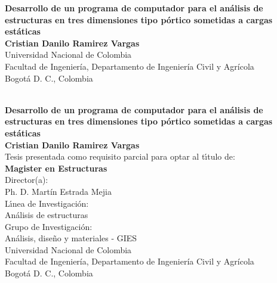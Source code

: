 \begin{center}
\begin{figure}
\centering%
%
\end{figure}
\thispagestyle{empty} \vspace*{2.0cm} \textbf{\huge
Desarrollo de un programa de computador para el análisis de estructuras en tres dimensiones tipo pórtico sometidas a cargas estáticas}\\[5.0cm]
\Large\textbf{Cristian Danilo Ramirez Vargas}\\[5.0cm]
\small Universidad Nacional de Colombia\\
Facultad de Ingeniería, Departamento de Ingeniería Civil y Agrícola\\
Bogotá D. C., Colombia\\
\the\year\\
\end{center}

\newpage{\pagestyle{empty}\cleardoublepage}

\newpage
\begin{center}
\thispagestyle{empty} \vspace*{0cm} \textbf{\huge
Desarrollo de un programa de computador para el análisis de estructuras en tres dimensiones tipo pórtico sometidas a cargas estáticas}\\[1.0cm]
\Large\textbf{Cristian Danilo Ramirez Vargas}\\[3.0cm]
\small Tesis presentada como requisito parcial para optar al
t\'{\i}tulo de:\\
\textbf{Magister en Estructuras}\\[2.5cm]
Director(a):\\
Ph. D. Martín Estrada Mejia\\[2.0cm]
L\'{\i}nea de Investigaci\'{o}n:\\
Análisis de estructuras\\
Grupo de Investigaci\'{o}n:\\
Análisis, diseño y materiales - GIES\\[2.5cm]
Universidad Nacional de Colombia\\
Facultad de Ingeniería, Departamento de Ingeniería Civil y Agrícola\\
Bogotá D. C., Colombia\\
\the\year\\
\end{center}

\newpage{\pagestyle{empty}\cleardoublepage}

